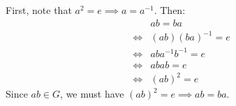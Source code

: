 \begin{sol}
    First, note that $a^2 = e \implies a = a^{-1}$. Then:
    \begin{align}
        & ab = ba \\ 
        \iff & (ab)(ba)^{-1} = e \\ 
        \iff & aba^{-1}b^{-1} = e \\ 
        \iff & abab = e \\ 
        \iff & (ab)^2 = e 
    \end{align}
    Since $ab \in G$, we must have $(ab)^2 = e \implies ab=ba$.
\end{sol}